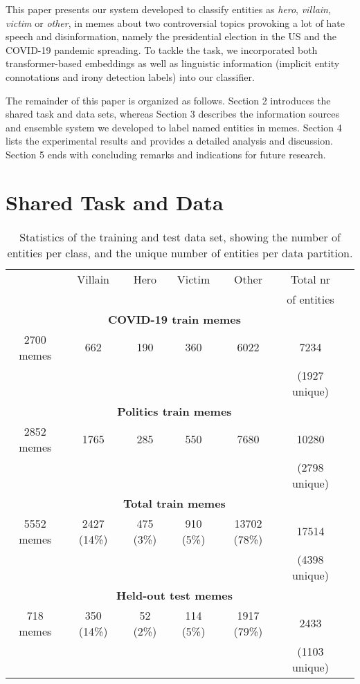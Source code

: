 \documentclass[11pt]{article}
\begin{document}
This paper presents our system developed to classify entities as \emph{hero}, \emph{villain}, \emph{victim} or \emph{other}, in memes about two controversial topics provoking a lot of hate speech and disinformation, namely the presidential election in the US and the COVID-19 pandemic spreading. To tackle the task, we incorporated both transformer-based embeddings as well as linguistic information (implicit entity connotations and irony detection labels) into our classifier.

The remainder of this paper is organized as follows.
Section 2 introduces the shared task and data sets, whereas Section 3 describes the information sources and ensemble system we developed to label named entities in memes. Section 4 lists the experimental results and provides a detailed analysis and discussion. 
Section 5 ends with concluding remarks and indications for future research.

\section{Shared Task and Data}

\begin{table*}[t!]
\centering
\begin{tabular}{|c|c|c|c|c|c|c|}\hline 
&Villain  &Hero  &Victim &Other & Total nr  \\
&  &  & & & of entities \\
\hline
\multicolumn{6}{|c|}{\textbf{COVID-19 train memes }} \\  \hline
2700 memes & 662& 190& 360& 6022 & 7234\\
&  &  & & & (1927 unique)   \\
\hline

\multicolumn{6}{|c|}{\textbf{Politics train memes }} \\  \hline
2852 memes & 1765& 285 &550 &7680 & 10280 \\
&  &  & & & (2798 unique)  \\
\hline
\multicolumn{6}{|c|}{\textbf{Total train memes }} \\  \hline
5552 memes & 2427 (14\%)& 475 (3\%) &910 (5\%) &13702 (78\%) & 17514\\
&  &  & & & (4398 unique)  \\
\hline
\multicolumn{6}{|c|}{\textbf{Held-out test memes }} \\  \hline
718 memes & 350 (14\%)& 52 (2\%) &114 (5\%) &1917 (79\%) & 2433\\
&  &  & & & (1103 unique)   \\
\hline
\end{tabular}
\caption{Statistics of the training and test data set, showing the number of entities per class, and the unique number of entities per data partition.}\label{data}
\end{table*}
\end{document}

